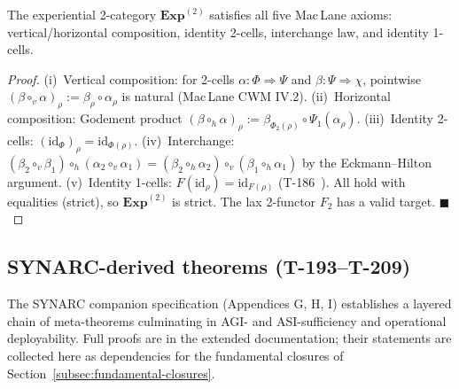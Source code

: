 \begin{theorembox}
\label{thm:t192-2cat}
The experiential 2-category $\mathbf{Exp}^{(2)}$ satisfies all five
Mac\,Lane axioms: vertical/horizontal composition, identity 2-cells,
interchange law, and identity 1-cells.
\end{theorembox}

\begin{proof}
(i)~Vertical composition: for 2-cells $\alpha: \Phi \Rightarrow \Psi$
and $\beta: \Psi \Rightarrow \chi$, pointwise $(\beta \circ_v \alpha)_\rho
:= \beta_\rho \circ \alpha_\rho$ is natural (Mac\,Lane CWM IV.2).
(ii)~Horizontal composition: Godement product
$(\beta \circ_h \alpha)_\rho := \beta_{\Phi_2(\rho)} \circ \Psi_1(\alpha_\rho)$.
(iii)~Identity 2-cells: $(\mathrm{id}_\Phi)_\rho = \mathrm{id}_{\Phi(\rho)}$.
(iv)~Interchange: $(\beta_2 \circ_v \beta_1) \circ_h (\alpha_2 \circ_v \alpha_1)
= (\beta_2 \circ_h \alpha_2) \circ_v (\beta_1 \circ_h \alpha_1)$
by the Eckmann--Hilton argument.
(v)~Identity 1-cells: $F(\mathrm{id}_\rho) = \mathrm{id}_{F(\rho)}$
(T-186~). All hold with equalities (strict), so
$\mathbf{Exp}^{(2)}$ is strict. The lax 2-functor $F_2$ has a valid
target. $\blacksquare$
\end{proof}

\subsection{SYNARC-derived theorems (T-193--T-209)}
\label{subsec:synarc-theorems}

The SYNARC companion specification (Appendices G, H, I) establishes a
layered chain of meta-theorems culminating in AGI- and ASI-sufficiency
and operational deployability. Full proofs are in the extended
documentation; their statements are collected here as dependencies for
the fundamental closures of Section~\ref{subsec:fundamental-closures}.

